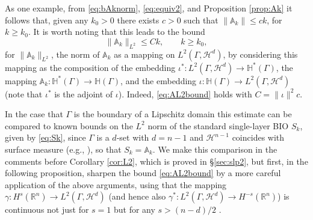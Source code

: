 \documentclass{birkjour}
\theoremstyle{definition}
\theoremstyle{remark}
\numberwithin{equation}{section}
\newcommand{\R}{\mathbb{R}}
\newcommand{\cH}{\mathcal{H}}
\newcommand{\bA}{\mathbb{A}}
\newcommand{\bH}{\mathbb{H}}
\begin{document}
As one example, from \eqref{eq:bAknorm}, \eqref{eq:equiv2}, and Proposition \ref{prop:Ak} it follows that, given any $k_0>0$ there exists $c>0$ such that $\|\bA_k\|\leq ck$, for $k\geq k_0$. It is worth noting that this leads to the  bound
\begin{equation} \label{eq:AL2bound}
\|\bA_k\|_{L^2} \leq Ck, \qquad k\geq k_0,
\end{equation}
for $\|\bA_k\|_{L^2}$, the norm of $\bA_k$ as a mapping on $L^2(\Gamma,\cH^d)$, by considering this mapping as the composition of the embedding $\iota^*:L^2(\Gamma,\cH^d)\to\bH^*(\Gamma)$, the mapping $\bA_k:\bH^*(\Gamma)\to \bH(\Gamma)$, and the embedding $\iota:\bH(\Gamma)\to L^2(\Gamma,\cH^d)$ (note that $\iota^*$ is the adjoint of $\iota$). Indeed, \eqref{eq:AL2bound} holds with $C= \|\iota\|^2 c$. 

In the case that $\Gamma$ is the boundary of a Lipschitz domain this estimate can be compared to known bounds on the $L^2$ norm of the standard single-layer BIO $S_k$, given by \eqref{eq:Sk}, since $\Gamma$ is a $d$-set with $d=n-1$ and $\cH^{n-1}$ coincides with surface measure (e.g., \cite[Theorem 3.8]{EvansGariepy}), so that $S_k=\bA_k$. We make this comparison in the comments before Corollary \ref{cor:L2}, which is proved in \S\ref{sec:slp2}, but first, in the following proposition, sharpen the bound \eqref{eq:AL2bound} by a more careful application of the above arguments, using that the mapping  $\gamma:H^s(\R^n)\to L^2(\Gamma,\cH^d)$ (and hence also $\gamma^*:L^2(\Gamma,\cH^d)\to H^{-s}(\R^n)$) is continuous not just for $s=1$ but for any $s>(n-d)/2$ \cite[Theorem 1]{Jonsson79}.
\end{document}
